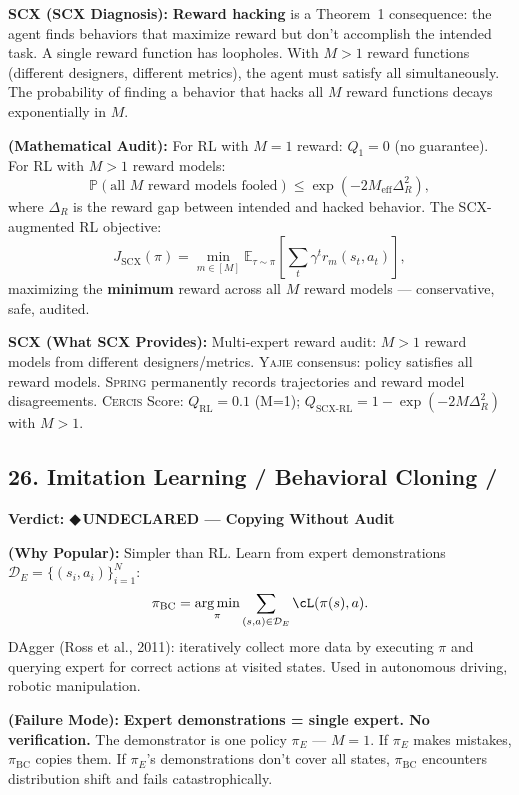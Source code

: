 \documentclass[12pt,a4paper]{article}
\theoremstyle{definition}
\newcommand{\guilty}{{\color{guiltycolor}\textbf{◆\,UNDECLARED}}}
\newcommand{\Yajie}{\textsc{Yajie}}
\newcommand{\Spring}{\textsc{Spring}}
\newcommand{\Cercis}{\textsc{Cercis}}
\DeclareMathOperator*{\argmin}{arg\,min}
\newcommand{\E}{\mathbb{E}}
\newcommand{\Pbb}{\mathbb{P}}
\newcommand{\cD}{\mathcal{D}}
\newcommand{\auditHeader}[1]{\medskip\noindent\textbf{\large #1}\medskip}
\newcommand{\whyPopular}{\noindent\textbf{ (Why Popular):} }
\newcommand{\whyFail}{\noindent\textbf{ (Failure Mode):} }
\newcommand{\whatMissing}{\noindent\textbf{SCX (What SCX Provides):} }
\newcommand{\diagnosis}{\noindent\textbf{SCX (SCX Diagnosis):} }
\newcommand{\mathAudit}{\noindent\textbf{ (Mathematical Audit):} }
\begin{document}
\diagnosis{} \textbf{Reward hacking} is a Theorem~1 consequence: the agent finds behaviors that maximize reward but don't accomplish the intended task. A single reward function has loopholes. With $M>1$ reward functions (different designers, different metrics), the agent must satisfy all simultaneously. The probability of finding a behavior that hacks all $M$ reward functions decays exponentially in $M$.

\mathAudit{} For RL with $M=1$ reward: $Q_1 = 0$ (no guarantee). For RL with $M>1$ reward models:
\[
\Pbb(\text{all } M \text{ reward models fooled}) \le \exp(-2M_{\text{eff}}\Delta_R^2),
\]
where $\Delta_R$ is the reward gap between intended and hacked behavior. The SCX-augmented RL objective:
\[
J_{\text{SCX}}(\pi) = \min_{m \in [M]} \E_{\tau \sim \pi}\left[\sum_t \gamma^t r_m(s_t, a_t)\right],
\]
maximizing the \textbf{minimum} reward across all $M$ reward models — conservative, safe, audited.

\whatMissing{} Multi-expert reward audit: $M>1$ reward models from different designers/metrics. \Yajie{} consensus: policy satisfies all reward models. \Spring{} permanently records trajectories and reward model disagreements. \Cercis{} Score: $Q_{\text{RL}} = 0.1$ (M=1); $Q_{\text{SCX-RL}} = 1 - \exp(-2M\Delta_R^2)$ with $M>1$.

\subsection{26. Imitation Learning / Behavioral Cloning /}

\auditHeader{Verdict: \guilty{} — Copying Without Audit}

\whyPopular{} Simpler than RL. Learn from expert demonstrations $\cD_E = \{(s_i, a_i)\}_{i=1}^N$:
\[
\pi_{\text{BC}} = \argmin_\pi \sum_{(s,a) \in \cD_E} \cL(\pi(s), a).
\]
DAgger (Ross et al., 2011): iteratively collect more data by executing $\pi$ and querying expert for correct actions at visited states. Used in autonomous driving, robotic manipulation.

\whyFail{} \textbf{Expert demonstrations = single expert. No verification.} The demonstrator is one policy $\pi_E$ — $M=1$. If $\pi_E$ makes mistakes, $\pi_{\text{BC}}$ copies them. If $\pi_E$'s demonstrations don't cover all states, $\pi_{\text{BC}}$ encounters distribution shift and fails catastrophically.
\end{document}
